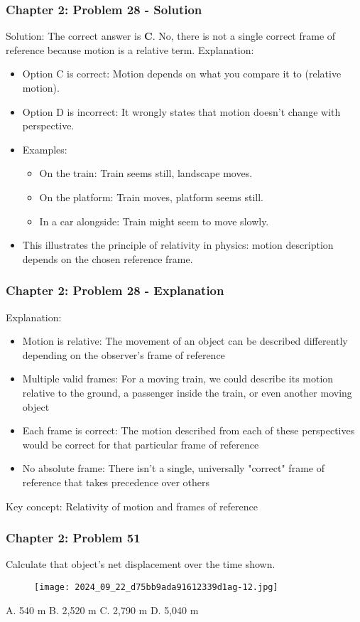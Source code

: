 \documentclass{beamer}
\begin{document}
\begin{frame}
\frametitle{Chapter 2: Problem 28 - Solution}
Solution: The correct answer is \textbf{C}. No, there is not a single correct frame of reference because motion is a relative term.
Explanation:
\begin{itemize}
\item Option C is correct: Motion depends on what you compare it to (relative motion).
\item Option D is incorrect: It wrongly states that motion doesn't change with perspective.
\item Examples:
\begin{itemize}
\item On the train: Train seems still, landscape moves.
\item On the platform: Train moves, platform seems still.
\item In a car alongside: Train might seem to move slowly.
\end{itemize}
\item This illustrates the principle of relativity in physics: motion description depends on the chosen reference frame.
\end{itemize}
\end{frame}
\begin{frame}
\frametitle{Chapter 2: Problem 28 - Explanation}
Explanation:
\begin{itemize}
    \item Motion is relative: The movement of an object can be described differently depending on the observer's frame of reference
    \item Multiple valid frames: For a moving train, we could describe its motion relative to the ground, a passenger inside the train, or even another moving object
    \item Each frame is correct: The motion described from each of these perspectives would be correct for that particular frame of reference
    \item No absolute frame: There isn't a single, universally "correct" frame of reference that takes precedence over others
\end{itemize}
Key concept: Relativity of motion and frames of reference
\end{frame}

\begin{frame}
\frametitle{Chapter 2: Problem 51}
Calculate that object's net displacement over the time shown.
\begin{figure}
    \centering
    \texttt{[image: 2024\_09\_22\_d75bb9ada91612339d1ag-12.jpg]}
\end{figure}

A. 540 m
B. 2,520 m
C. 2,790 m
D. 5,040 m
\end{frame}
\end{document}

